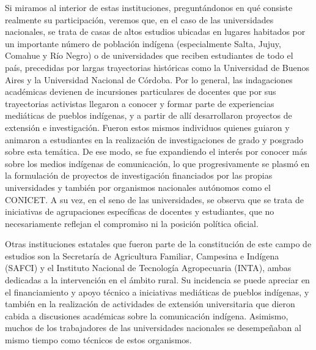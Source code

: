 \documentclass{tufte-handout}
\begin{document}
Si miramos al interior de estas instituciones, preguntándonos en qué
consiste realmente su participación, veremos que, en el caso de las
universidades nacionales, se trata de casas de altos estudios ubicadas
en lugares habitados por un importante número de población indígena
(especialmente Salta, Jujuy, Comahue y Río Negro) o de universidades que
reciben estudiantes de todo el país, precedidas por largas trayectorias
históricas como la Universidad de Buenos Aires y la Universidad Nacional
de Córdoba. Por lo general, las indagaciones académicas devienen de
incursiones particulares de docentes que por sus trayectorias activistas
llegaron a conocer y formar parte de experiencias mediáticas de pueblos
indígenas, y a partir de allí desarrollaron proyectos de extensión e
investigación. Fueron estos mismos individuos quienes guiaron y animaron
a estudiantes en la realización de investigaciones de grado y posgrado
sobre esta temática. De ese modo, se fue expandiendo el interés por
conocer más sobre los medios indígenas de comunicación, lo que
progresivamente se plasmó en la formulación de proyectos de
investigación financiados por las propias universidades y también por
organismos nacionales autónomos como el CONICET. A su vez, en el seno de
las universidades, se observa que se trata de iniciativas de
agrupaciones específicas de docentes y estudiantes, que no
necesariamente reflejan el compromiso ni la posición política oficial.

Otras instituciones estatales que fueron parte de la constitución de
este campo de estudios son la Secretaría de Agricultura Familiar,
Campesina e Indígena (SAFCI) y el Instituto Nacional de Tecnología
Agropecuaria (INTA), ambas dedicadas a la intervención en el ámbito
rural. Su incidencia se puede apreciar en el financiamiento y apoyo
técnico a iniciativas mediáticas de pueblos indígenas, y también en la
realización de actividades de extensión universitaria que dieron cabida
a discusiones académicas sobre la comunicación indígena. Asimismo,
muchos de los trabajadores de las universidades nacionales se
desempeñaban al mismo tiempo como técnicos de estos organismos.
\end{document}
